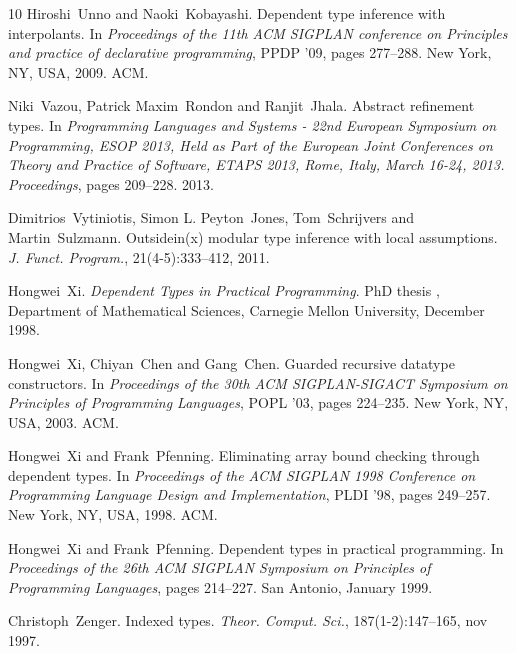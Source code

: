 \documentclass{article}
\newcommand{\tmtextit}[1]{{\itshape{#1}}}
\begin{document}
\begin{thebibliography}{10}
  Hiroshi~Unno  and 
  Naoki~Kobayashi.{\newblock} Dependent type inference with
  interpolants.{\newblock} In \tmtextit{Proceedings of the 11th ACM SIGPLAN
  conference on Principles and practice of declarative programming}, PPDP '09,
  pages  277--288. New York, NY, USA, 2009. ACM.{\newblock}
  
  Niki~Vazou, Patrick Maxim~Rondon  and 
  Ranjit~Jhala.{\newblock} Abstract refinement types.{\newblock} In
  \tmtextit{Programming Languages and Systems - 22nd European Symposium on
  Programming, ESOP 2013, Held as Part of the European Joint Conferences on
  Theory and Practice of Software, ETAPS 2013, Rome, Italy, March 16-24, 2013.
  Proceedings},  pages  209--228. 2013.{\newblock}
  
  Dimitrios~Vytiniotis, Simon L. Peyton~Jones,
  Tom~Schrijvers  and  Martin~Sulzmann.{\newblock} Outsidein(x) modular type
  inference with local assumptions.{\newblock} \tmtextit{J. Funct. Program.},
  21(4-5):333--412, 2011.{\newblock}
  
  Hongwei~Xi.{\newblock} \tmtextit{Dependent Types in
  Practical Programming}.{\newblock} PhD thesis , Department of Mathematical
  Sciences, Carnegie Mellon University, December 1998.{\newblock}
  
  Hongwei~Xi, Chiyan~Chen  and  Gang~Chen.{\newblock}
  Guarded recursive datatype constructors.{\newblock} In \tmtextit{Proceedings
  of the 30th ACM SIGPLAN-SIGACT Symposium on Principles of Programming
  Languages}, POPL '03,  pages  224--235. New York, NY, USA, 2003.
  ACM.{\newblock}
  
  Hongwei~Xi  and  Frank~Pfenning.{\newblock}
  Eliminating array bound checking through dependent types.{\newblock} In
  \tmtextit{Proceedings of the ACM SIGPLAN 1998 Conference on Programming
  Language Design and Implementation}, PLDI '98,  pages  249--257. New York,
  NY, USA, 1998. ACM.{\newblock}
  
  Hongwei~Xi  and  Frank~Pfenning.{\newblock} Dependent
  types in practical programming.{\newblock} In \tmtextit{Proceedings of the
  26th ACM SIGPLAN Symposium on Principles of Programming Languages},  pages 
  214--227. San Antonio, January 1999.{\newblock}
  
  Christoph~Zenger.{\newblock} Indexed
  types.{\newblock} \tmtextit{Theor. Comput. Sci.}, 187(1-2):147--165, nov
  1997.{\newblock}
  

\end{thebibliography}
\end{document}
